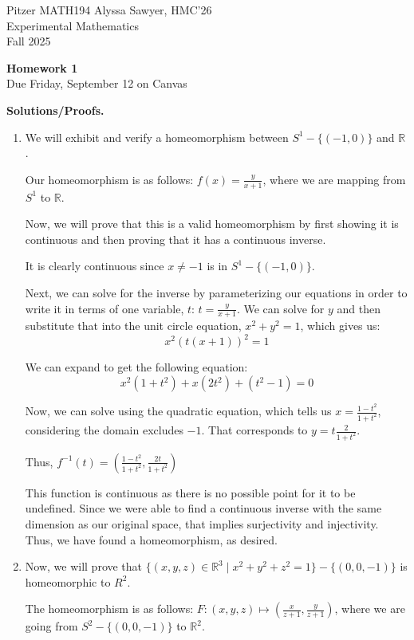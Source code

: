 \documentclass[12pt]{article}
\begin{document}
Pitzer MATH194 \hfill Alyssa Sawyer, HMC'26  
\\
Experimental Mathematics \hfill  \\
Fall 2025
\begin{center}
{\large \bf Homework 1}\\
Due Friday, September 12 on Canvas
\end{center}

{\bf Solutions/Proofs.}
\begin{enumerate}

\item
We will exhibit and verify a homeomorphism between $S^1 - \{(-1,0)\}$ and $\mathbb{R}$. 

Our homeomorphism is as follows: $f(x) = \frac{y}{x+1}$, where we are mapping from $S^1$ to $\mathbb{R}$.

Now, we will prove that this is a valid homeomorphism by first showing it is continuous and then proving that it has a continuous inverse.

It is clearly continuous since $x \neq -1$ is in $S^1 - \{(-1,0)\}$. 

Next, we can solve for the inverse by parameterizing our equations in order to write it in terms of one variable, $t$: $t =\frac{y}{x+1}$. We can solve for $y$ and then substitute that into the unit circle equation, $x^2 + y^2 = 1$, which gives us:
\[x^2 (t(x+1))^2 = 1\]

We can expand to get the following equation:
\[x^2(1+t^2) + x(2t^2) + (t^2 -1) = 0 \]

Now, we can solve using the quadratic equation, which tells us $x= \frac{1-t^2}{1+t^2}$, considering the domain excludes $-1$. That corresponds to $y=t \frac{2}{1+t^2}$. 

Thus, $f^{-1}(t) =( \frac{1-t^2}{1+t^2}, \frac{2t}{1+t^2})$

This function is continuous as there is no possible point for it to be undefined. Since we were able to find a continuous inverse with the same dimension as our original space, that implies surjectivity and injectivity. Thus, we have found a homeomorphism, as desired. 

\newpage
\item Now, we will prove that $\{(x,y,z) \in \mathbb{R}^3 \mid x^2 + y^2 + z^2 = 1\}- \{(0,0,-1)\}$ is homeomorphic to $R^2$.

The homeomorphism is as follows: 
$F: (x,y,z) \mapsto (\frac{x}{z+1}, \frac{y}{z+1})$, where we are going from $S^2 - \{(0,0,-1)\}$ to $\mathbb{R}^2$. 


\end{enumerate}
\end{document}
